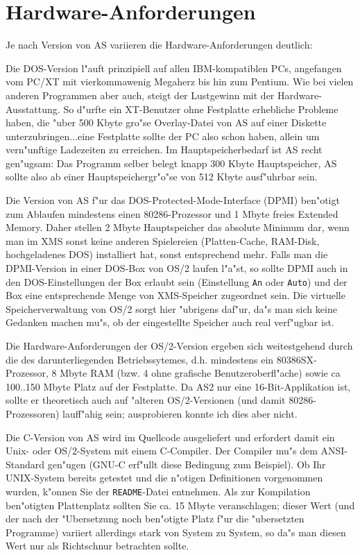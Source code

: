 \documentclass[12pt,a4paper,twoside]{report}
\newcommand{\tty}[1]{{\tt #1}}
\begin{document}

\section{Hardware-Anforderungen}

Je nach Version von AS variieren die Hardware-Anforderungen deutlich:

Die DOS-Version  l"auft prinzipiell auf allen
IBM-kompatiblen PCs, angefangen vom PC/XT mit vierkommawenig Megaherz bis
hin zum Pentium.  Wie bei vielen anderen Programmen aber auch, steigt der
Lustgewinn mit der Hardware-Ausstattung.  So d"urfte ein XT-Benutzer ohne
Festplatte erhebliche Probleme haben, die "uber 500 Kbyte gro"se
Overlay-Datei von AS auf einer Diskette unterzubringen...eine Festplatte
sollte der PC also schon haben, allein um vern"unftige Ladezeiten zu
erreichen.  Im Hauptspeicherbedarf ist AS recht gen"ugsam: Das Programm
selber belegt knapp 300 Kbyte Hauptspeicher, AS sollte also ab einer
Hauptspeichergr"o"se von 512 Kbyte ausf"uhrbar sein.

Die Version von AS f"ur das 
DOS-Protected-Mode-Interface (DPMI) ben"otigt zum Ablaufen mindestens
einen 80286-Prozessor und 1 Mbyte freies Extended Memory.  Daher stellen 2
Mbyte Hauptspeicher das absolute Minimum dar, wenn man im XMS sonst keine
anderen Spielereien (Platten-Cache, RAM-Disk, hochgeladenes DOS)
installiert hat, sonst entsprechend mehr.  Falls man die DPMI-Version in
einer DOS-Box von OS/2 laufen l"a"st, so sollte DPMI auch in den
DOS-Einstellungen der Box erlaubt sein (Einstellung \tty{An} oder
\tty{Auto}) und der Box eine entsprechende Menge von XMS-Speicher
zugeordnet sein.  Die virtuelle Speicherverwaltung von OS/2 sorgt hier
"ubrigens daf"ur, da"s man sich keine Gedanken machen mu"s, ob der
eingestellte Speicher auch real verf"ugbar ist.

Die Hardware-Anforderungen der  OS/2-Version ergeben sich
weitestgehend durch die des darunterliegenden Betriebssytemes, d.h.
mindestens ein 80386SX-Prozessor, 8 Mbyte RAM (bzw. 4 ohne grafische
Benutzeroberfl"ache) sowie ca 100..150 Mbyte Platz auf der Festplatte.  Da
AS2 nur eine 16-Bit-Applikation ist, sollte er theoretisch auch auf
"alteren OS/2-Versionen (und damit 80286-Prozessoren) lauff"ahig sein;
ausprobieren konnte ich dies aber nicht.

Die C-Version  von AS wird im Quellcode ausgeliefert
und erfordert damit ein Unix- oder OS/2-System mit einem C-Compiler.
Der Compiler mu"s dem ANSI-Standard gen"ugen (GNU-C erf"ullt diese
Bedingung zum Beispiel).  Ob Ihr UNIX-System bereits getestet und die
n"otigen Definitionen vorgenommen wurden, k"onnen Sie der \tty{README}-Datei
entnehmen.  Als zur Kompilation ben"otigten Plattenplatz sollten Sie
ca. 15 Mbyte veranschlagen; dieser Wert (und der nach der "Ubersetzung
noch ben"otigte Platz f"ur die "ubersetzten Programme) variiert
allerdings stark von System zu System, so da"s man diesen Wert nur als
Richtschnur betrachten sollte.
\end{document}
